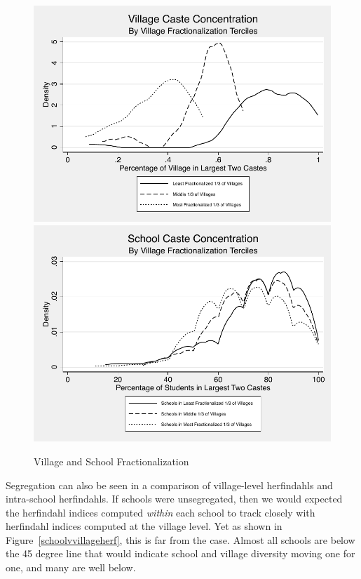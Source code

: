 \documentclass[Eubank_pk_ethnic_sorting.tex]{subfiles}
\begin{document}
\begin{figure}[H]
	\begin{center}
		\caption{Village and School Fractionalization}\label{toptwo}
		\includegraphics[scale=.6]{../graphs/village_toptwo.pdf}\includegraphics[scale=0.6]{../graphs/school_toptwo.pdf}
	\end{center}
\end{figure}

Segregation can also be seen in a comparison of village-level herfindahls and intra-school herfindahls. If schools were unsegregated, then we would expected the herfindahl indices computed \emph{within} each school to track closely with herfindahl indices computed at the village level. Yet as shown in Figure~\ref{schoolvvillageherf}, this is far from the case. Almost all schools are below the 45 degree line that would indicate school and village diversity moving one for one, and many are well below.
\end{document}
